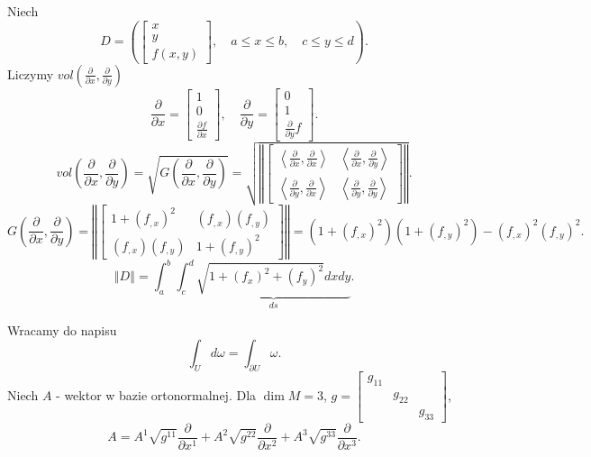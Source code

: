 \documentclass[../main.tex]{subfiles}
\begin{document}
\begin{przyklad}
    Niech
     \[
         D = \left( \begin{bmatrix} x\\y\\f(x,y) \end{bmatrix},\quad a\le x\le b,\quad c\le y \le d  \right)
    .\]
Liczymy $vol(\frac{\partial }{\partial x} , \frac{\partial }{\partial y}) $
\[
\frac{\partial }{\partial x} = \begin{bmatrix} 1\\0\\ \frac{\partial f}{\partial x} \end{bmatrix}, \quad \frac{\partial }{\partial y} = \begin{bmatrix} 0\\1\\ \frac{\partial }{\partial y} f \end{bmatrix}
.\]
\[
    vol(\frac{\partial }{\partial x} , \frac{\partial }{\partial y} ) = \sqrt{G\left(\frac{\partial }{\partial x} , \frac{\partial }{\partial y} \right)} = \sqrt{\left\Vert \begin{bmatrix} \left<\frac{\partial }{\partial x} , \frac{\partial }{\partial x}  \right>& \left<\frac{\partial }{\partial x} , \frac{\partial }{\partial y}  \right>\\ \left<\frac{\partial }{\partial y} , \frac{\partial }{\partial x}  \right>& \left<\frac{\partial }{\partial y} , \frac{\partial }{\partial y}  \right> \end{bmatrix}  \right\Vert }
.\]
\[
    G\left( \frac{\partial }{\partial x} , \frac{\partial }{\partial y}  \right) = \left\Vert \begin{bmatrix} 1 + (f_{,x})^2& (f_{,x})(f_{,y})\\ (f_{,x})(f_{,y})& 1 + (f_{,y})^2 \end{bmatrix}  \right\Vert = \left( 1 + (f_{,x})^2 \right) \left( 1 + (f_{,y})^2 \right)  - (f_{,x})^2(f_{,y})^2
.\]
\[
    \left\Vert D \right\Vert = \int_a^b\int_c^d \underbrace{\sqrt{1 + (f_x)^2 + (f_y)^2} dxdy}_{ds}
.\]
\end{przyklad}
Wracamy do napisu
\[
\int_Ud\omega = \int_{\partial U}\omega
.\]
Niech $A$ - wektor w bazie ortonormalnej. Dla $\dim M = 3$, $g = \begin{bmatrix} g_{11}&&\\&g_{22}&\\&&g_{33} \end{bmatrix} $,
    \[
    A = A^1 \sqrt{g^{11}} \frac{\partial }{\partial x^1} + A^2 \sqrt{g^{22}} \frac{\partial }{\partial x^2} + A^3 \sqrt{g^{33}} \frac{\partial }{\partial x^3}
    .\]
\end{document}
